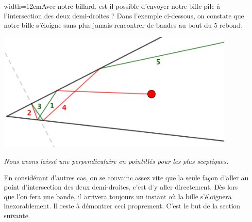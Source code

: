 width=12cmAvec notre billard, est-il possible d'envoyer notre bille pile à l'intersection des deux demi-droites ?
Dans l'exemple ci-dessous, on constate que notre bille s'éloigne sans plus jamais rencontrer de bandes au bout du 5\ieme{} rebond.
 
\medskip

\begin{center}
	\includegraphics[width=12cm]{basic-math-pool/example-divergence.png}
	
	\itshape\small
	Nous avons laissé une perpendiculaire en pointillés pour les plus sceptiques.
\end{center}

\medskip

En considérant d'autres cas, on se convainc assez vite que la seule façon d'aller au point d'intersection des deux demi-droites, c'est d'y aller directement.
Dès lors que l'on fera une bande, il arrivera toujours un instant où la bille s'éloignera inexorablement. Il reste à démontrer ceci proprement. C'est le but de la section suivante.